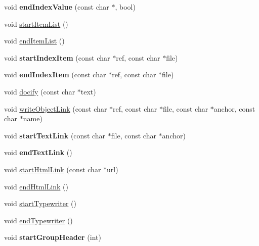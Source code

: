 \begin{DoxyCompactItemize}
void {\bfseries end\+Index\+Value} (const char $\ast$, bool)
\item 
void \mbox{\hyperlink{class_html_generator_aedec2c1429139e4fd713df22e5636879}{start\+Item\+List}} ()
\item 
void \mbox{\hyperlink{class_html_generator_aa5dc9b6c49ebf68dd54942d258716206}{end\+Item\+List}} ()
\item 
\mbox{\label{class_html_generator_a02517c155d2b9fe903d33424927a95ac}} 
void {\bfseries start\+Index\+Item} (const char $\ast$ref, const char $\ast$file)
\item 
\mbox{\label{class_html_generator_af6cae0eaf27fd2124f46fe009a045e51}} 
void {\bfseries end\+Index\+Item} (const char $\ast$ref, const char $\ast$file)
\item 
void \mbox{\hyperlink{class_html_generator_a1f33982a4ce6eac13224197e91f057d8}{docify}} (const char $\ast$text)
\item 
void \mbox{\hyperlink{class_html_generator_a26b15cf05292634e086ec26cede20f2e}{write\+Object\+Link}} (const char $\ast$ref, const char $\ast$file, const char $\ast$anchor, const char $\ast$name)
\item 
\mbox{\label{class_html_generator_a61a18a9d5cfa300f91af10bd72f4f51b}} 
void {\bfseries start\+Text\+Link} (const char $\ast$file, const char $\ast$anchor)
\item 
\mbox{\label{class_html_generator_ab2b0bff4d5587ad095832783fdba8064}} 
void {\bfseries end\+Text\+Link} ()
\item 
void \mbox{\hyperlink{class_html_generator_a5fdd7ff7fcabd4e301b8fec2b9c72b85}{start\+Html\+Link}} (const char $\ast$url)
\item 
void \mbox{\hyperlink{class_html_generator_af6ca967739e45755318c78058115c27a}{end\+Html\+Link}} ()
\item 
void \mbox{\hyperlink{class_html_generator_ae3174a7318289e8f7042f2d10345c419}{start\+Typewriter}} ()
\item 
void \mbox{\hyperlink{class_html_generator_a574b29296b93ffa4c3b119cbee70269c}{end\+Typewriter}} ()
\item 
\mbox{\label{class_html_generator_a1368991b5988b527dc0c5b0b05cbb5b1}} 
void {\bfseries start\+Group\+Header} (int)

\end{DoxyCompactItemize}
